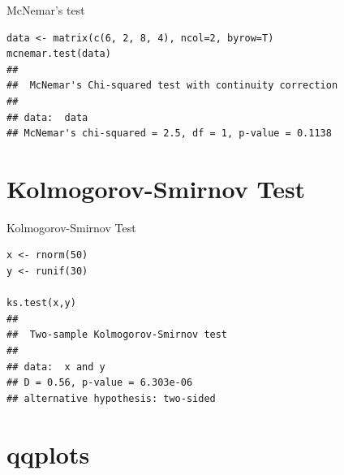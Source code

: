 \documentclass[12pt, t, xcolor=dvipsnames]{beamer}
\begin{document}
\begin{frame}[fragile]{McNemar's test}
\begin{verbatim}
data <- matrix(c(6, 2, 8, 4), ncol=2, byrow=T)
mcnemar.test(data)
## 
##  McNemar's Chi-squared test with continuity correction
## 
## data:  data
## McNemar's chi-squared = 2.5, df = 1, p-value = 0.1138
\end{verbatim}
\end{frame}










\section{Kolmogorov-Smirnov Test} %
\label{sec:kolmogorov_smirnov_test}

\begin{frame}[fragile]{Kolmogorov-Smirnov Test}

\begin{verbatim}
x <- rnorm(50) 
y <- runif(30)

ks.test(x,y)
## 
##  Two-sample Kolmogorov-Smirnov test
## 
## data:  x and y
## D = 0.56, p-value = 6.303e-06
## alternative hypothesis: two-sided
\end{verbatim}
\end{frame}





\section{qqplots} %
\label{sec:qqplots}
\end{document}
